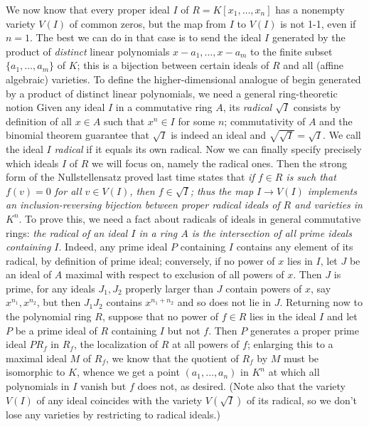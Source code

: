 We now know that every proper ideal $I$ of $R=K[x_1,\ldots,x_n]$ has a nonempty variety $V(I)$ of common zeros, but the map from $I$ to $V(I)$ is not 1-1, even if $n=1$.  The best we can do in that case is to send the ideal $I$ generated by the product of {\sl distinct} linear polynomials
$x-a_1,\ldots,x-a_m$ to the finite subset $\{a_1,\ldots,a_m\}$ of $K$; this is a bijection between certain ideals of $R$ and all (affine algebraic) varieties.  To define the higher-dimensional analogue of begin generated by a product of distinct linear polynomials, we need a general ring-theoretic notion  Given any ideal $I$ in a commutative ring $A$, its {\sl radical $\sqrt{I}$} consists by definition of all $x\in A$ such that $x^n\in I$ for some $n$; commutativity of $A$ and the binomial theorem guarantee that $\sqrt{I}$ is indeed an ideal and $\sqrt{\sqrt{I}} = \sqrt{I}$.  We call the ideal $I$ {\sl radical} if it equals its own radical.  Now we can finally specify precisely which ideals $I$ of $R$ we will focus on, namely the radical ones.  Then the strong form of the Nullstellensatz proved last time states that {\sl if $f\in R$ is such that $f(v) = 0$ for all $v\in V(I)$, then $f\in\sqrt{I}$; thus the map $I\rightarrow V(I)$ implements an inclusion-reversing bijection between proper radical ideals of $R$ and varieties in
$K^n$}.  To prove this, we need a fact about radicals of ideals in general commutative rings:  {\sl the radical of an ideal $I$ in a ring $A$ is the intersection of all prime ideals containing $I$}.  Indeed, any prime ideal $P$ containing $I$ contains any element of its radical, by definition of prime ideal; conversely, if no power of $x$ lies in $I$, let $J$ be an ideal of $A$ maximal with respect to exclusion of all powers of $x$.  Then $J$ is prime, for any ideals $J_1,J_2$ properly larger than $J$ contain powers of $x$, say $x^{n_1},x^{n_2}$, but then $J_1 J_2$ contains $x^{n_1+n_2}$ and so does not lie in $J$.  Returning now to the polynomial ring $R$, suppose that no power of $f\in R$ lies in the ideal $I$ and let $P$ be a prime ideal of $R$ containing $I$ but not $f$.  Then $P$ generates a proper prime ideal $PR_f$ in $R_f$, the localization of $R$ at all powers of $f$; enlarging this to a maximal ideal $M$ of $R_f$, we know that the quotient of $R_f$ by $M$ must be isomorphic to $K$, whence we get a point $(a_1,\ldots,a_n)$ in $K^n$ at which all polynomials in $I$ vanish but $f$ does not, as desired.  (Note also that the variety $V(I)$ of any ideal coincides with the variety $V(\sqrt{I})$ of its radical, so we don't lose any varieties by restricting to radical ideals.)  

